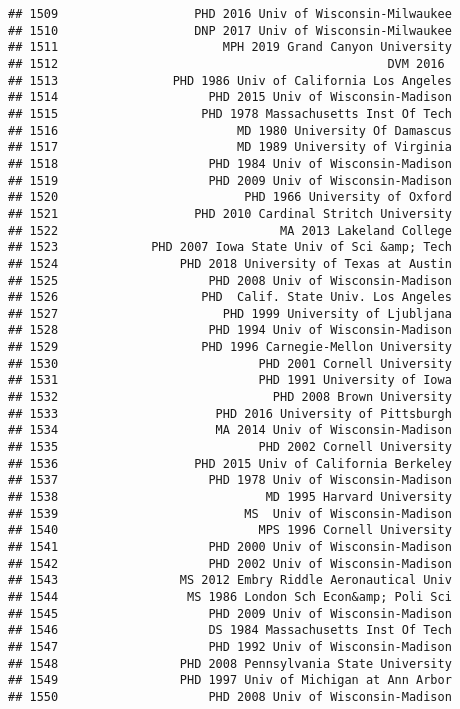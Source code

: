 \documentclass[
]{article}
\begin{document}
\begin{verbatim}
## 1509                   PHD 2016 Univ of Wisconsin-Milwaukee
## 1510                   DNP 2017 Univ of Wisconsin-Milwaukee
## 1511                       MPH 2019 Grand Canyon University
## 1512                                              DVM 2016 
## 1513                PHD 1986 Univ of California Los Angeles
## 1514                     PHD 2015 Univ of Wisconsin-Madison
## 1515                    PHD 1978 Massachusetts Inst Of Tech
## 1516                         MD 1980 University Of Damascus
## 1517                         MD 1989 University of Virginia
## 1518                     PHD 1984 Univ of Wisconsin-Madison
## 1519                     PHD 2009 Univ of Wisconsin-Madison
## 1520                          PHD 1966 University of Oxford
## 1521                   PHD 2010 Cardinal Stritch University
## 1522                               MA 2013 Lakeland College
## 1523             PHD 2007 Iowa State Univ of Sci &amp; Tech
## 1524                 PHD 2018 University of Texas at Austin
## 1525                     PHD 2008 Univ of Wisconsin-Madison
## 1526                    PHD  Calif. State Univ. Los Angeles
## 1527                       PHD 1999 University of Ljubljana
## 1528                     PHD 1994 Univ of Wisconsin-Madison
## 1529                    PHD 1996 Carnegie-Mellon University
## 1530                            PHD 2001 Cornell University
## 1531                            PHD 1991 University of Iowa
## 1532                              PHD 2008 Brown University
## 1533                      PHD 2016 University of Pittsburgh
## 1534                      MA 2014 Univ of Wisconsin-Madison
## 1535                            PHD 2002 Cornell University
## 1536                   PHD 2015 Univ of California Berkeley
## 1537                     PHD 1978 Univ of Wisconsin-Madison
## 1538                             MD 1995 Harvard University
## 1539                          MS  Univ of Wisconsin-Madison
## 1540                            MPS 1996 Cornell University
## 1541                     PHD 2000 Univ of Wisconsin-Madison
## 1542                     PHD 2002 Univ of Wisconsin-Madison
## 1543                 MS 2012 Embry Riddle Aeronautical Univ
## 1544                  MS 1986 London Sch Econ&amp; Poli Sci
## 1545                     PHD 2009 Univ of Wisconsin-Madison
## 1546                     DS 1984 Massachusetts Inst Of Tech
## 1547                     PHD 1992 Univ of Wisconsin-Madison
## 1548                 PHD 2008 Pennsylvania State University
## 1549                 PHD 1997 Univ of Michigan at Ann Arbor
## 1550                     PHD 2008 Univ of Wisconsin-Madison

\end{verbatim}
\end{document}
